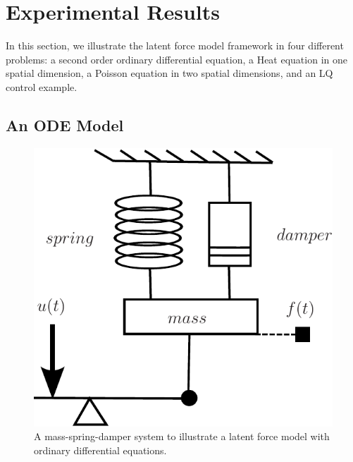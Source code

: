 \documentclass[journal]{IEEEtran}
\begin{document}
\section{Experimental Results}

In this section, we illustrate the latent force model framework in four different problems: a second order
ordinary differential equation, a Heat equation in one spatial
dimension, a Poisson equation in two spatial dimensions, and an LQ
control example. 

\subsection{An ODE Model}
%
\begin{figure}[!t]
\centering
\includegraphics[width=\columnwidth]{massSpringDamper}
\caption{A mass-spring-damper system to illustrate a latent force model with ordinary differential equations.}
\label{mass:spring:damper:figure}
\end{figure}
\end{document}
